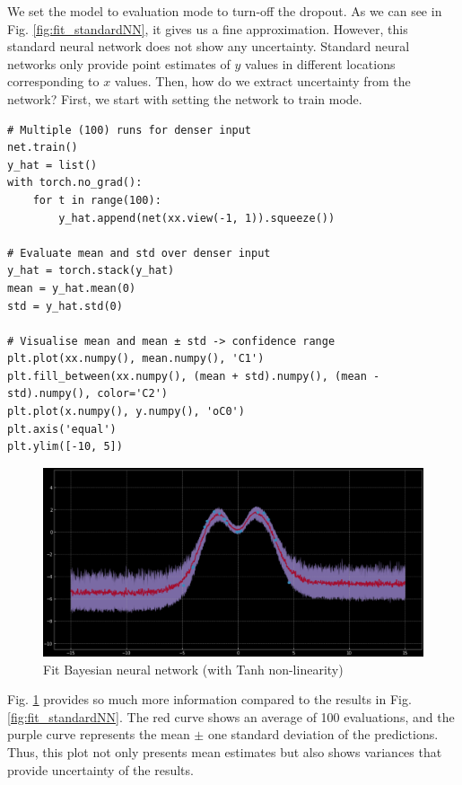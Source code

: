 We set the model to evaluation mode to turn-off the dropout. As we can see in Fig. \ref{fig:fit_standardNN}, it gives us a fine approximation. However, this standard neural network does not show any uncertainty. Standard neural networks only provide point estimates of $y$ values in different locations corresponding to $x$ values. Then, how do we extract uncertainty from the network? First, we start with setting the network to train mode. 

\begin{verbatim}
# Multiple (100) runs for denser input
net.train()
y_hat = list()
with torch.no_grad():
    for t in range(100):
        y_hat.append(net(xx.view(-1, 1)).squeeze())
        
# Evaluate mean and std over denser input
y_hat = torch.stack(y_hat)
mean = y_hat.mean(0)
std = y_hat.std(0)

# Visualise mean and mean ± std -> confidence range
plt.plot(xx.numpy(), mean.numpy(), 'C1')
plt.fill_between(xx.numpy(), (mean + std).numpy(), (mean - std).numpy(), color='C2')
plt.plot(x.numpy(), y.numpy(), 'oC0')
plt.axis('equal')
plt.ylim([-10, 5])
\end{verbatim}

\begin{figure}[H]
    \centering
    \includegraphics[width=\textwidth]{figs/exp_3.png}
    \caption{Fit Bayesian neural network (with Tanh non-linearity)}
    \label{fig:fit_BayesianNN}
\end{figure}

Fig. \ref{fig:fit_BayesianNN} provides so much more information compared to the results in Fig. \ref{fig:fit_standardNN}. The red curve shows an average of 100 evaluations, and the purple curve represents the mean $\pm$ one standard deviation of the predictions. Thus, this plot not only presents mean estimates but also shows variances that provide uncertainty of the results. 

